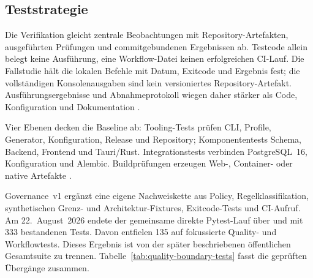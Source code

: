 \subsection{Teststrategie}
\label{subsec:teststrategie}

Die Verifikation gleicht zentrale Beobachtungen mit Repository-Artefakten,
ausgeführten Prüfungen und commitgebundenen Ergebnissen ab. Testcode allein
belegt keine Ausführung, eine Workflow-Datei keinen erfolgreichen CI-Lauf.
Die Fallstudie hält die lokalen Befehle mit Datum, Exitcode und Ergebnis fest;
die vollständigen Konsolenausgaben sind kein versioniertes Repository-Artefakt.
Ausführungsergebnisse und Abnahmeprotokoll wiegen daher stärker als Code,
Konfiguration und Dokumentation
\parencite{runeson2009case-study,iso25010-2023}.

Vier Ebenen decken die Baseline ab: Tooling-Tests prüfen CLI, Profile,
Generator, Konfiguration, Release und Repository; Komponententests Schema,
Backend, Frontend und Tauri/Rust. Integrationstests verbinden PostgreSQL~16,
Konfiguration und Alembic. Buildprüfungen erzeugen Web-, Container- oder native
Artefakte \parencite{kleiveist2026ci}.

Governance~v1 ergänzt eine eigene Nachweiskette aus Policy,
Regelklassifikation, synthetischen Grenz- und Architektur-Fixtures,
Exitcode-Tests und CI-Aufruf. Am 22.~August~2026 endete der gemeinsame direkte
Pytest-Lauf über  und  mit 333
bestandenen Tests. Davon entfielen 135 auf fokussierte Quality- und
Workflowtests. Dieses Ergebnis ist von der später beschriebenen öffentlichen
Gesamtsuite zu trennen. Tabelle~\ref{tab:quality-boundary-tests} fasst die
geprüften Übergänge zusammen.

